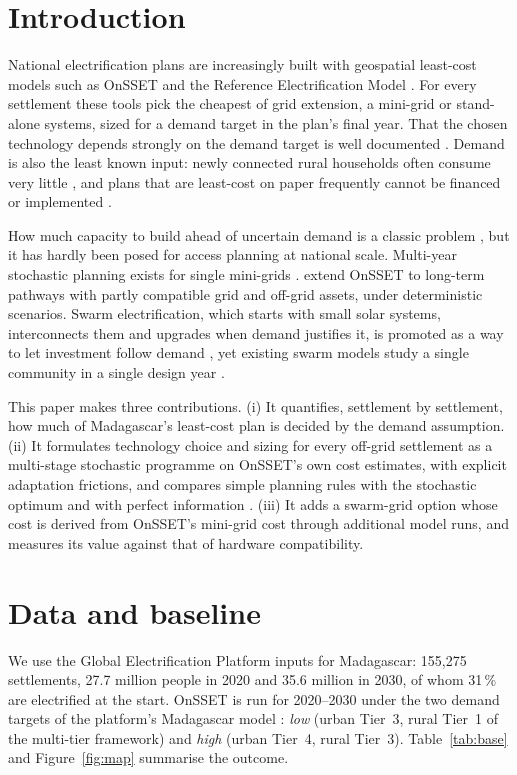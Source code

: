 \documentclass[11pt,a4paper]{article}
\begin{document}
\section{Introduction}
National electrification plans are increasingly built with geospatial least-cost models such as OnSSET
\citep{mentis2017} and the Reference Electrification Model \citep{rem2018}. For every settlement these tools pick the
cheapest of grid extension, a mini-grid or stand-alone systems, sized for a demand target in the plan's final year.
That the chosen technology depends strongly on the demand target is well documented
\citep{korkovelos2019,sahlberg2023}. Demand is also the least known input: newly connected rural households often
consume very little \citep{lee2019}, and plans that are least-cost on paper frequently cannot be financed or
implemented \citep{diazpastor2026}.

How much capacity to build ahead of uncertain demand is a classic problem \citep{manne1961,dixit1994}, but it has
hardly been posed for access planning at national scale. Multi-year stochastic planning exists for single
mini-grids \citep{fioriti2021}. \citet{sahlberg2023} extend OnSSET to long-term pathways with partly compatible grid
and off-grid assets, under deterministic scenarios. Swarm electrification, which starts with small solar systems,
interconnects them and upgrades when demand justifies it, is promoted as a way to let investment follow demand
\citep{groh2014,kirchhoff2019,sheridan2023}, yet existing swarm models study a single community in a single
design year \citep{hoffmann2019,bertram2024,dumitrescu2022,ouanes2026}.

This paper makes three contributions. (i) It quantifies, settlement by settlement, how much of Madagascar's
least-cost plan is decided by the demand assumption. (ii) It formulates technology choice and sizing for every
off-grid settlement as a multi-stage stochastic programme on OnSSET's own cost estimates, with explicit adaptation
frictions, and compares simple planning rules with the stochastic optimum and with perfect information
\citep{birge1982}. (iii) It adds a swarm-grid option whose cost is derived from OnSSET's mini-grid cost through
additional model runs, and measures its value against that of hardware compatibility.

\section{Data and baseline}
We use the Global Electrification Platform inputs for Madagascar: 155,275 settlements, 27.7 million people in 2020
and 35.6 million in 2030, of whom 31\,\% are electrified at the start. OnSSET is run for 2020--2030 under the two
demand targets of the platform's Madagascar model \citep{gep2019}: \emph{low} (urban Tier~3, rural Tier~1 of the
multi-tier framework) and \emph{high} (urban Tier~4, rural Tier~3). Table~\ref{tab:base} and
Figure~\ref{fig:map} summarise the outcome.
\end{document}
